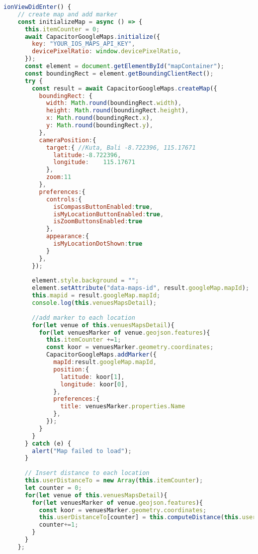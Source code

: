 \begin{lstlisting}[language=JavaScript, label={lst:venues-map.page.ts}, caption=venues-map.page.ts]
  ionViewDidEnter() {
    // create map and add marker
    const initializeMap = async () => {
      this.itemCounter = 0;
      await CapacitorGoogleMaps.initialize({
        key: "YOUR_IOS_MAPS_API_KEY",
        devicePixelRatio: window.devicePixelRatio,
      });
      const element = document.getElementById("mapContainer");
      const boundingRect = element.getBoundingClientRect();
      try {
        const result = await CapacitorGoogleMaps.createMap({
          boundingRect: {
            width: Math.round(boundingRect.width),
            height: Math.round(boundingRect.height),
            x: Math.round(boundingRect.x),
            y: Math.round(boundingRect.y),
          },
          cameraPosition:{
            target:{ //Kuta, Bali -8.722396, 115.17671
              latitude:-8.722396, 
              longitude: 	115.17671
            },
            zoom:11
          },
          preferences:{
            controls:{
              isCompassButtonEnabled:true,
              isMyLocationButtonEnabled:true,
              isZoomButtonsEnabled:true
            },
            appearance:{
              isMyLocationDotShown:true
            }
          },
        });
        
        element.style.background = "";
        element.setAttribute("data-maps-id", result.googleMap.mapId);
        this.mapid = result.googleMap.mapId;
        console.log(this.venuesMapsDetail);
        
        //add marker to each location
        for(let venue of this.venuesMapsDetail){
          for(let venuesMarker of venue.geojson.features){
            this.itemCounter +=1;
            const koor = venuesMarker.geometry.coordinates;  
            CapacitorGoogleMaps.addMarker({
              mapId:result.googleMap.mapId,
              position:{
                latitude: koor[1],
                longitude: koor[0],
              },
              preferences:{
                title: venuesMarker.properties.Name
              },
            });     
          }
        }
      } catch (e) {
        alert("Map failed to load");
      }
  
      // Insert distance to each location
      this.userDistanceTo = new Array(this.itemCounter);
      let counter = 0;
      for(let venue of this.venuesMapsDetail){
        for(let venuesMarker of venue.geojson.features){
          const koor = venuesMarker.geometry.coordinates;  
          this.userDistanceTo[counter] = this.computeDistance(this.userCoordinatesLat,koor[1],this.userCoordinatesLng,koor[0]);
          counter+=1;
        }
      }
    };


\end{lstlisting}
